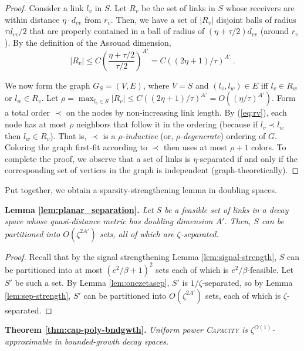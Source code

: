 \documentclass[11pt]{amsart}
\newcommand{\prob}[1]{\textsc{#1}}
\newcommand{\Capacity}{\prob{Capacity}}
\newcommand{\capacity}{\Capacity}
\begin{document}
\begin{proof}
Consider a link $l_v$ in $S$. Let $R_v$ be the set
of links in $S$ whose receivers are within distance $\eta \cdot
d_{vv}$ from $r_v$. Then, we have a set of $|R_v|$
disjoint balls of radius $\tau d_{vv}/2$ that are properly contained
in a ball of radius of $(\eta +\tau/2) d_{vv}$ (around $r_v$).
By the definition of the Assouad dimension, 
\begin{equation}
|R_v| \le C \left(\frac{\eta+\tau/2}{\tau/2}\right)^{A'}
   = C \left((2 \eta+1)/\tau\right)^{A'} \ .
\label{eq:rv}
\end{equation}

We now form the graph $G_{S} = (V,E)$, where $V = S$ and 
$(l_v, l_w) \in E$ iff $l_v \in R_w$ or $l_w \in R_v$.
Let $\rho = \max_{l_v \in S} |R_v| \le C ((2\eta+1)/\tau)^{A'} 
  = O((\eta/\tau)^{A'})$.
Form a total order $\prec$ on the nodes by non-increasing link length.
By (\ref{eq:rv}), each node has at most $\rho$ neighbors that follow it in the ordering (because if $l_v \prec l_w$ then $l_w \in R_v$). That is, $\prec$ is a 
\emph{$\rho$-inductive} (or, \emph{$\rho$-degenerate}) ordering of $G$.
Coloring the graph first-fit according to $\prec$ then uses at most $\rho+1$ colors. 
To complete the proof, we observe that a set of links is $\eta$-separated
if and only if the corresponding set of vertices in the graph is independent 
(graph-theoretically). 
\end{proof}

Put together, we obtain a sparsity-strengthening lemma in doubling spaces.

\noindent \textbf{Lemma \ref{lem:planar_separation}.} \emph{
Let $S$ be a feasible set of links in a decay space whose
  quasi-distance metric has doubling dimension $A'$.  Then, $S$ can be
  partitioned into $O(\zeta^{2A'})$ sets, all of which are
  $\zeta$-separated.
}

\begin{proof}
Recall that by the signal strengthening Lemma
\ref{lem:signal-strength}, $S$ can be partitioned into at most
$(e^2/\beta+1)^2$ sets each of which is $e^2/\beta$-feasible.  Let
$S'$ be such a set.  By Lemma \ref{lem:onezetasep}, $S'$ is
$1/\zeta$-separated, so by Lemma \ref{lem:sep-strength}, $S'$ can be
partitioned into $O(\zeta^{2A'})$ sets, each of which is
$\zeta$-separated.
\end{proof}


\noindent \textbf{Theorem \ref{thm:cap-poly-bndgwth}.} \emph{
Uniform power {\capacity} is $\zeta^{O(1)}$-approximable in
  bounded-growth decay spaces.
}
\end{document}
